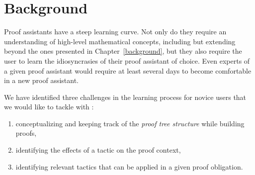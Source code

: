 \section{Background}

Proof assistants have a steep learning curve.  Not only do they require an
understanding of high-level mathematical concepts, including but extending
beyond the ones presented in Chapter~\ref{background}, but they also require the
user to learn the idiosyncrasies of their proof assistant of choice.  Even
experts of a given proof assistant would require at least several days to
become comfortable in a new proof assistant.


We have identified three challenges in the learning process for novice users
that we would like to tackle with \PeaCoq{}:

\begin{enumerate}

  \item conceptualizing and keeping track of the \emph{proof tree structure}
while building proofs,

  \item identifying the effects of a tactic on the proof context,

  \item identifying relevant tactics that can be applied in a given proof
obligation.

\end{enumerate}
